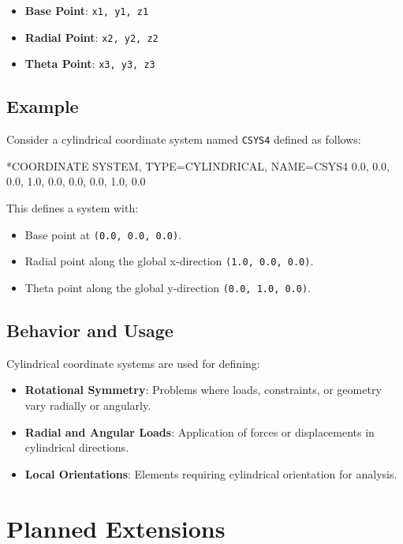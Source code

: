 \begin{itemize}
\item \textbf{Base Point}: \texttt{x1, y1, z1}
\item \textbf{Radial Point}: \texttt{x2, y2, z2}
\item \textbf{Theta Point}: \texttt{x3, y3, z3}
\end{itemize}


\subsection{Example}


Consider a cylindrical coordinate system named \texttt{CSYS4} defined as follows:


\begin{codeBlock}
*COORDINATE SYSTEM, TYPE=CYLINDRICAL, NAME=CSYS4
0.0, 0.0, 0.0, 1.0, 0.0, 0.0, 0.0, 1.0, 0.0
\end{codeBlock}


This defines a system with:


\begin{itemize}
\item Base point at \texttt{(0.0, 0.0, 0.0)}.
\item Radial point along the global x-direction \texttt{(1.0, 0.0, 0.0)}.
\item Theta point along the global y-direction \texttt{(0.0, 1.0, 0.0)}.
\end{itemize}


\subsection{Behavior and Usage}


Cylindrical coordinate systems are used for defining:


\begin{itemize}
\item \textbf{Rotational Symmetry}: Problems where loads, constraints, or geometry vary radially or angularly.
\item \textbf{Radial and Angular Loads}: Application of forces or displacements in cylindrical directions.
\item \textbf{Local Orientations}: Elements requiring cylindrical orientation for analysis.
\end{itemize}


\section{Planned Extensions}


